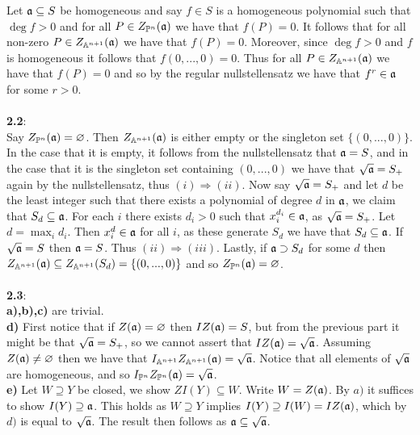 \documentclass[12pt]{article}
\numberwithin{thm}{subsection}
\numberwithin{defn}{subsection}
\numberwithin{lemma}{subsection}
\numberwithin{example}{subsection}
\numberwithin{notation}{subsection}
\numberwithin{cor}{subsection}
\numberwithin{remark}{subsection}
\numberwithin{condition}{subsection}
\numberwithin{question}{subsection}
\numberwithin{construction}{subsection}
\numberwithin{construction}{subsection}
\numberwithin{construction}{subsection}
\newcommand{\bb}[1]{\mathbb{#1}}
\begin{document}
Let $\frak{a} \subseteq S$ be homogeneous and say $f \in S$ is a homogeneous polynomial such that $\operatorname{deg}f>0$ and for all $P \in Z_{\bb{P}^n}(\frak{a})$ we have that $f(P) = 0$. It follows that for all non-zero $P \in Z_{\bb{A}^{n+1}}(\frak{a})$ we have that $f(P) = 0$. Moreover, since $\operatorname{deg}f > 0$ and $f$ is homogeneous it follows that $f(0,...,0) = 0$. Thus for all $P \in Z_{\bb{A}^{n+1}}(\frak{a})$ we have that $f(P) = 0$ and so by the regular nullstellensatz we have that $f^r \in \frak{a}$ for some $r > 0$.\\\\
%
\textbf{2.2}:\\
Say $Z_{\bb{P}^n}(\frak{a}) = \varnothing$. Then $Z_{\bb{A}^{n+1}}(\frak{a})$ is either empty or the singleton set $\lbrace (0,...,0)\rbrace$. In the case that it is empty, it follows from the nullstellensatz that $\frak{a} = S$, and in the case that it is the singleton set containing $(0,...,0)$ we have that $\sqrt{\frak{a}} = S_+$ again by the nullstellensatz, thus $(i) \Rightarrow (ii)$. Now say $\sqrt{\frak{a}} = S_+$ and let $d$ be the least integer such that there exists a polynomial of degree $d$ in $\frak{a}$, we claim that $S_d \subseteq \frak{a}$. For each $i$ there exists $d_i > 0$ such that $x_i^{d_i} \in \frak{a}$, as $\sqrt{\frak{a}} = S_+$. Let $d = \operatorname{max}_id_i$. Then $x_i^d \in \frak{a}$ for all $i$, as these generate $S_d$ we have that $S_d \subseteq \frak{a}$. If $\sqrt{\frak{a}} = S$ then $\frak{a} = S$. Thus $(ii) \Rightarrow (iii)$. Lastly, if $\frak{a} \supset S_d$ for some $d$ then $Z_{\bb{A}^{n+1}}(\frak{a}) \subseteq Z_{\bb{A}^{n+1}}(S_d) = \lbrace (0,...,0)\rbrace$ and so $Z_{\bb{P}^{n}}(\frak{a}) = \varnothing$.\\\\
%
\textbf{2.3}:\\
\textbf{a),b),c)} are trivial.\\
%
\textbf{d)} First notice that if $Z(\frak{a}) = \varnothing$ then $IZ(\frak{a}) = S$, but from the previous part it might be that $\sqrt{\frak{a}} = S_+$, so we cannot assert that $IZ(\frak{a}) = \sqrt{\frak{a}}$. Assuming $Z(\frak{a}) \neq \varnothing$ then we have that $I_{\bb{A}^{n+1}}Z_{\bb{A}^{n+1}}(\frak{a}) = \sqrt{\frak{a}}$. Notice that all elements of $\sqrt{\frak{a}}$ are homogeneous, and so $I_{\bb{P}^n}Z_{\bb{P}^n}(\frak{a}) = \sqrt{\frak{a}}$.\\
%
\textbf{e)} Let $W \supseteq Y$ be closed, we show $ZI(Y) \subseteq W$. Write $W = Z(\frak{a})$. By $a)$ it suffices to show $I(Y) \supseteq \frak{a}$. This holds as $W \supseteq Y$ implies $I(Y) \supseteq I(W) = IZ(\frak{a})$, which by $d)$ is equal to $\sqrt{\frak{a}}$. The result then follows as $\frak{a} \subseteq \sqrt{\frak{a}}$.\\\\
\end{document}
